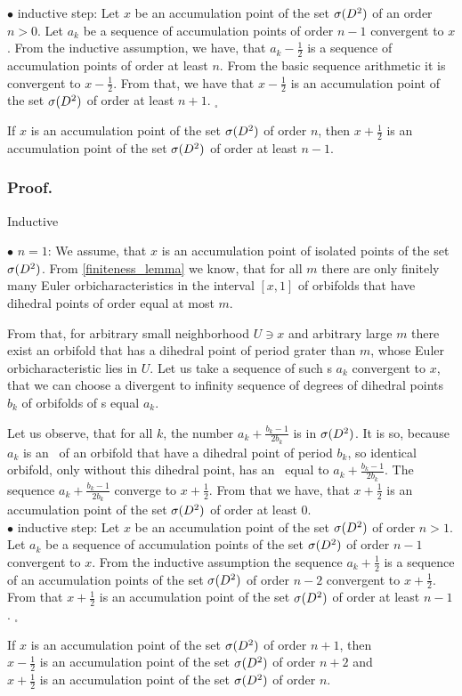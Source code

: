 $\bullet$ inductive step: Let $x$ be an accumulation point of the set ${{\sigma}(D^2)}$ of an order 
$n > 0$. 
Let $a_k$ be a sequence of accumulation points of order $n-1$ convergent to $x$. From the 
inductive assumption, we have, that $a_k - \frac{1}{2}$ is a sequence of accumulation points 
of order at least $n$. From the basic sequence arithmetic it is convergent to $x-\frac{1}{2}$. 
From that, we have that $x-\frac{1}{2}$ is an accumulation point of the set ${{\sigma}(D^2)}$ of order 
at least $n+1$. $_\square$
\begin{lemma}\label{second_order_lemma}
If $x$ is an accumulation point of the set ${{\sigma}(D^2)}$ of order $n$, then $x+\frac{1}{2}$ is 
an accumulation point of the set ${{\sigma}(D^2)}$ of order at least $n-1$.  
\end{lemma}
\subsubsection{Proof.}  
Inductive 

$\bullet$ $n = 1$: We assume, that $x$ is an accumulation point of isolated points of the set 
${{\sigma}(D^2)}$. 
From \ref{finiteness_lemma} we know, that for all $m$ there are only finitely many 
Euler orbicharacteristics 
in the interval $[x,1]$ of orbifolds that have dihedral points of order equal at most $m$. 

From that, for arbitrary small neighborhood $U \ni x$ and arbitrary large $m$ there exist 
an orbifold 
that has a dihedral point of period grater than $m$, whose Euler orbicharacteristic lies in $U$. 
Let us take a sequence of such \Eoc s $a_k$ convergent to $x$, that we can choose 
a divergent to infinity sequence of degrees of dihedral points $b_k$ of orbifolds of \Eoc s 
equal $a_k$. 

Let us observe, that for all $k$, the number $a_k+\frac{b_k-1}{2b_k}$ is in ${{\sigma}(D^2)}$. 
It is so, because $a_k$ is an \Eoc\ of an orbifold that have a dihedral point of period $b_k$, so 
identical orbifold, only without this dihedral point, has an \Eoc\ equal to $a_k + 
\frac{b_k-1}{2b_k}$. 
The sequence $a_k + \frac{b_k-1}{2b_k}$ converge to $x+\frac{1}{2}$. From that we have, that 
$x + \frac{1}{2}$ is an accumulation point of the set ${{\sigma}(D^2)}$ of order at least $0$. \\
$\bullet$ inductive step: Let $x$ be an accumulation point of the set ${{\sigma}(D^2)}$ of order $n > 1$. 
Let $a_k$ be a sequence of accumulation points of the set ${{\sigma}(D^2)}$ of order $n-1$ 
convergent to $x$. 
From the inductive assumption the sequence $a_k + \frac{1}{2}$ is a sequence of an accumulation
 points of the set ${{\sigma}(D^2)}$ of order $n-2$ convergent to $x + \frac{1}{2}$. From that 
 $x + \frac{1}{2}$ is an accumulation point of the set ${{\sigma}(D^2)}$ of order at least 
 $n-1$. $_\square$ 
\begin{lemma}\label{third_order_lemma}
If $x$ is an accumulation point of the set ${{\sigma}(D^2)}$ of order $n+1$, then \\
$x - \frac{1}{2}$ is an accumulation point of the set ${{\sigma}(D^2)}$ of order $n+2$ and \\
$x + \frac{1}{2}$ is an accumulation point of the set ${{\sigma}(D^2)}$ of order $n$. 
\end{lemma}
